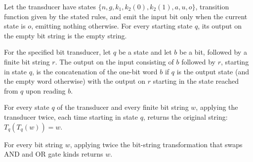 \begin{theorem}
\label{BoolCircuit.CktSatReduction.S_nil}
\leanok
{}
Let the transducer have states $\{n,g,k_1,k_2(0),k_2(1),a,u,o\}$, transition function
given by the stated rules, and emit the input bit only when the current state is $o$,
emitting nothing otherwise. For every starting state $q$, its output on the empty bit
string is the empty string.
\end{theorem}

\begin{theorem}
\label{BoolCircuit.CktSatReduction.S_cons}
\leanok
{}
For the specified bit transducer, let $q$ be a state and let $b$ be a bit, followed by a
finite bit string $r$. The output on the input consisting of $b$ followed by $r$,
starting in state $q$, is the concatenation of the one-bit word $b$ if $q$ is the output
state (and the empty word otherwise) with the output on $r$ starting in the state
reached from $q$ upon reading $b$.
\end{theorem}

\begin{theorem}
\label{BoolCircuit.CktSatReduction.T_T}
\leanok
{}
For every state $q$ of the transducer and every finite bit string $w$, applying the
transducer twice, each time starting in state $q$, returns the original string:
$T_q(T_q(w))=w$.
\end{theorem}

\begin{theorem}
\label{BoolCircuit.CktSatReduction.swapKinds_swapKinds}
\leanok
{}
For every bit string $w$, applying twice the bit-string transformation that swaps AND
and OR gate kinds returns $w$.
\end{theorem}

